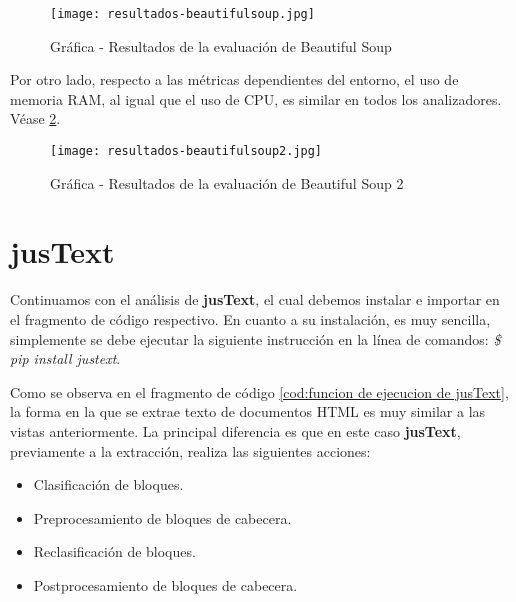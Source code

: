 \begin{figure}[tphb]
    \centering
    \texttt{[image: resultados-beautifulsoup.jpg]}
    \caption{Gráfica - Resultados de la evaluación de Beautiful Soup}
    \label{img:grafica - resultados de la evaluacion de beautiful soup}
\end{figure}

Por otro lado, respecto a las métricas dependientes del entorno, el uso de memoria RAM, al igual que el uso
de CPU, es similar en todos los analizadores. Véase \ref{img:grafica - resultados de la evaluacion de beautiful soup 2}.

\begin{figure}[tphb]
    \centering
    \texttt{[image: resultados-beautifulsoup2.jpg]}
    \caption{Gráfica - Resultados de la evaluación de Beautiful Soup 2}
    \label{img:grafica - resultados de la evaluacion de beautiful soup 2}
\end{figure}

\section*{jusText}

Continuamos con el análisis de \textbf{jusText}, el cual debemos instalar e importar en el fragmento de 
código respectivo. En cuanto a su instalación, es muy sencilla, simplemente se debe ejecutar la siguiente 
instrucción en la línea de comandos: \emph{\$ pip install justext}.

Como se observa en el fragmento de código \ref{cod:funcion de ejecucion de jusText}, la forma en la que
se extrae texto de documentos HTML es muy similar a las vistas anteriormente. La principal diferencia es
que en este caso \textbf{jusText}, previamente a la extracción, realiza las siguientes acciones:

\begin{itemize}
    \item Clasificación de bloques.
    \item Preprocesamiento de bloques de cabecera.
    \item Reclasificación de bloques.
    \item Postprocesamiento de bloques de cabecera.
\end{itemize}

\begin{codefloat}
    
    \caption{Función de ejecución de jusText}
    \label{cod:funcion de ejecucion de jusText}
\end{codefloat}

